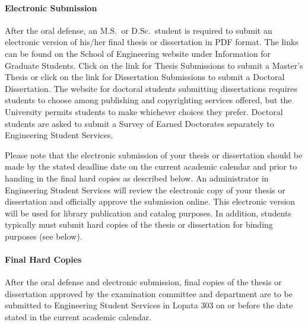 \paragraph{Electronic Submission}

After the oral defense, an M.S.\ or D.Sc.\ student is required to submit an
electronic version of his/her final thesis or dissertation in PDF format.  The
links can be found on the School of Engineering website under Information for
Graduate Students.   Click on the link for Thesis Submissions to submit a
Master's Thesis or click on the link for Dissertation Submissions to submit a
Doctoral Dissertation. The website for doctoral students submitting
dissertations requires students to choose among publishing and copyrighting
services offered, but the University permits students to make whichever choices
they prefer. Doctoral students are asked to submit a Survey of Earned
Doctorates separately to Engineering Student Services. 

Please note that the electronic submission of your thesis or dissertation
should be made by the stated deadline date on the current academic calendar and
prior to handing in the final hard copies as described below.  An administrator
in Engineering Student Services will review the electronic copy of your thesis
or dissertation and officially approve the submission online.  This electronic
version will be used for library publication and catalog purposes. In addition,
students typically must submit hard copies of the thesis or dissertation for
binding purposes (see below).  

\paragraph{Final Hard Copies}

After the oral defense and electronic submission, final copies of the thesis or
dissertation approved by the examination committee and department are to be
submitted to Engineering Student Services in Lopata 303 on or before the date
stated in the current academic calendar.

